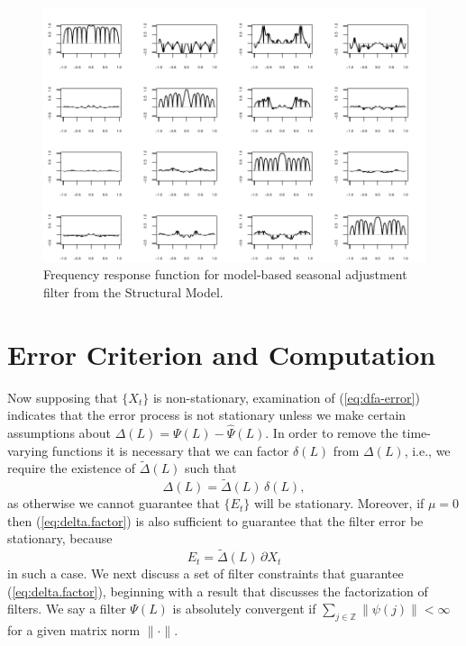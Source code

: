 \documentclass[a4paper]{book}
\def\ZZ{\mathbb Z}
\begin{document}
\begin{figure}[htb!]
\begin{center}
\includegraphics[]{sauc_frf.pdf}
\caption{Frequency response function for model-based seasonal adjustment
  filter from the Structural Model.}
\label{fig:sauc-frf}
\end{center}
\end{figure} 



\section{Error Criterion and Computation}
\label{sec:mdfa-nonstat}

 Now supposing that $\{ X_t \}$ is non-stationary,
 examination of (\ref{eq:dfa-error}) indicates that the error process is 
 not stationary unless we make certain assumptions
 about $\Delta (L) = \Psi (L) - \widehat{\Psi} (L)$.    
 In order to remove the time-varying functions it is necessary that 
 we can factor $\delta (L)$ from $\Delta (L)$, i.e., we require the existence of
 $\widetilde{\Delta } (L)$ such that
\begin{equation}
 \label{eq:delta.factor}
  \Delta (L) = \widetilde{\Delta } (L) \, \delta (L),
\end{equation}
 as otherwise we cannot guarantee that $\{ E_t \}$ will be stationary. 
  Moreover, if $\mu =0$ then (\ref{eq:delta.factor}) is also sufficient to guarantee
 that the filter error be stationary, because
\[
  E_t = \widetilde{\Delta} (L) \, \partial X_t
\]
 in such a case.   We next discuss a set of filter 
 constraints that guarantee (\ref{eq:delta.factor}), beginning with a result
 that discusses the factorization of filters.  
 We say a filter $\Psi (L)$ is absolutely convergent 
 if $\sum_{j \in \ZZ} \| \psi (j) \| < \infty$
 for a given matrix norm $\| \cdot \|$.
\end{document}

